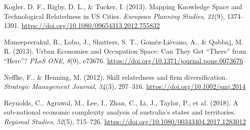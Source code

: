 \documentclass[
]{agujournal2019}
\newlength{\cslhangindent}
\newenvironment{CSLReferences}[2] %
 {\begin{list}{}{%
  \setlength{\itemindent}{0pt}
  \setlength{\leftmargin}{0pt}
  \setlength{\parsep}{0pt}
  \ifodd #1
   \setlength{\leftmargin}{\cslhangindent}
   \setlength{\itemindent}{-1\cslhangindent}
  \fi
  \setlength{\itemsep}{#2\baselineskip}}}
 {\end{list}}
\begin{document}
\begin{CSLReferences}{1}{0}
Kogler, D. F., Rigby, D. L., \& Tucker, I. (2013). Mapping Knowledge
Space and Technological Relatedness in US Cities. \emph{European
Planning Studies}, \emph{21}(9), 1374--1391.
\url{https://doi.org/10.1080/09654313.2012.755832}

Muneepeerakul, R., Lobo, J., Shutters, S. T., Goméz-Liévano, A., \&
Qubbaj, M. R. (2013). Urban Economies and Occupation Space: Can They Get
{``}There{''} from {``}Here{''}? \emph{PLoS ONE}, \emph{8}(9), e73676.
\url{https://doi.org/10.1371/journal.pone.0073676}

Neffke, F., \& Henning, M. (2012). Skill relatedness and firm
diversification. \emph{Strategic Management Journal}, \emph{34}(3),
297--316. \url{https://doi.org/10.1002/smj.2014}

Reynolds, C., Agrawal, M., Lee, I., Zhan, C., Li, J., Taylor, P., et al.
(2018). A sub-national economic complexity analysis of australia's
states and territories. \emph{Regional Studies}, \emph{52}(5), 715--726.
\url{https://doi.org/10.1080/00343404.2017.1283012}

\end{CSLReferences}
\end{document}
